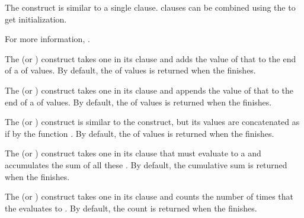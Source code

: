 
The  construct is similar to a single  clause.
 clauses can be combined using the  
to get  initialization.


For more information, \seesection\LOOPVarInitAndStep.

\endsubsubsubsection%

 
The  (or ) construct
takes one  in its clause
and adds the value of that  to the end of a  
of values.  By default, the  of values is returned 
when the  finishes.
 
The  (or ) construct 
takes one  in its clause
and appends the value of that  to the end of a 
of values.  By default, the  of values is returned when the 
 finishes.
 
The  (or ) construct 
is similar to the  construct,  
but its  values are concatenated as if by the function
.  By default, the  of values is returned when 
the  finishes.
 
The  (or ) construct 
takes one  in its clause 
that must evaluate to a  and accumulates the sum of all these
.  By default, the cumulative sum is returned when the
 finishes.
 
The  (or ) construct 
takes one  in its clause 
and counts the number of times that the  evaluates to .
By default, the count is returned when the  finishes.
 
